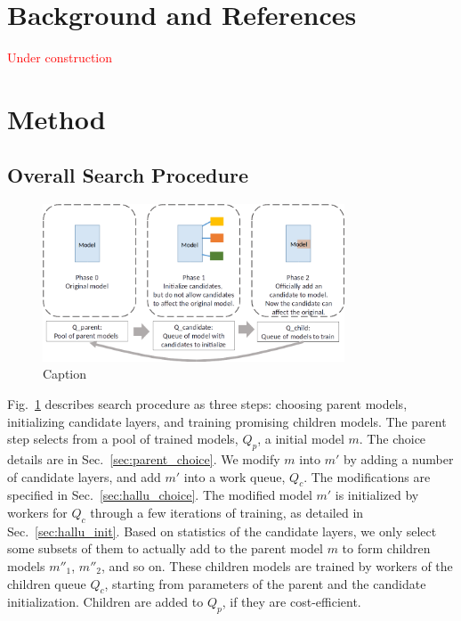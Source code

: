 \documentclass{article}
\newcommand{\todo}[1]{\textcolor{red}{#1}}
\begin{document}
\section{Background and References}

\todo{Under construction}

\section{Method}

\subsection{Overall Search Procedure}
\label{sec:search_procedure}

\begin{figure}
    \centering
    \includegraphics[width=0.8\textwidth]{img/three_queues.png}
    \caption{Caption}
    \label{fig:search_procedure}
\end{figure}

Fig.~\ref{fig:search_procedure} describes search procedure as three steps: choosing parent models, initializing candidate layers, and training promising children models. The parent step selects from a pool of trained models, $Q_{p}$, a initial model $m$. The choice details are in Sec.~\ref{sec:parent_choice}. We modify $m$ into $m'$ by adding a number of candidate layers, and add $m'$ into a work queue, $Q_{c}$. The modifications are specified in Sec.~\ref{sec:hallu_choice}. The modified model $m'$ is initialized by workers for $Q_{c}$ through a few iterations of training, as detailed in Sec.~\ref{sec:hallu_init}. 
Based on statistics of the candidate layers, we only select some subsets of them to actually add to the parent model $m$ to form children models $m''_1$, $m''_2$, and so on. These children models are trained by workers of the children queue $Q_{c}$, starting from parameters of the parent and the candidate initialization. Children are added to $Q_p$, if they are cost-efficient. 
\end{document}
